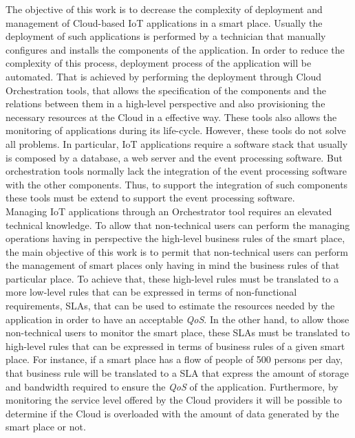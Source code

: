The objective of this work is to decrease the complexity of deployment and management
of Cloud-based IoT applications in a smart place. Usually the deployment of such applications
is performed by a technician that manually configures and installs the components of the application.
In order to reduce the complexity of this process, deployment process of the application will be automated.
That is achieved by performing the deployment through Cloud Orchestration tools, that allows the specification
of the components and the relations between them in a high-level perspective and also provisioning
the necessary resources at the Cloud in a effective way. These tools also allows the monitoring
of applications during its life-cycle. However, these tools do not solve all problems.
In particular, IoT applications require a software stack that usually is composed by a database,
a web server and the event processing software. But orchestration tools normally lack the
integration of the event processing software with the other components. Thus, to support the
integration of such components these tools must be extend to support the event processing software.\\

Managing IoT applications through an Orchestrator tool requires an elevated technical knowledge.
To allow that non-technical users can perform the managing operations having in perspective
the high-level business rules of the smart place, the main objective of this work is to permit
that non-technical users can perform the management of smart places only having in mind the business
rules of that particular place. To achieve that, these high-level rules must be translated to a more
low-level rules that can be expressed in terms of non-functional requirements, SLAs, that can be
used to estimate the resources needed by the application in order to have an acceptable \textit{QoS}.
In the other hand, to allow those non-technical users to monitor the smart place, these SLAs must
be translated to high-level rules that can be expressed in terms of business rules of a given smart place.
For instance, if a smart place has a flow of people of 500 persons per day, that business rule will be
translated to a SLA that express the amount of storage and bandwidth required to ensure the \textit{QoS}
of the application. Furthermore, by monitoring the service level offered by the Cloud providers it will be
possible to determine if the Cloud is overloaded with the amount of data generated by the smart place or not.
